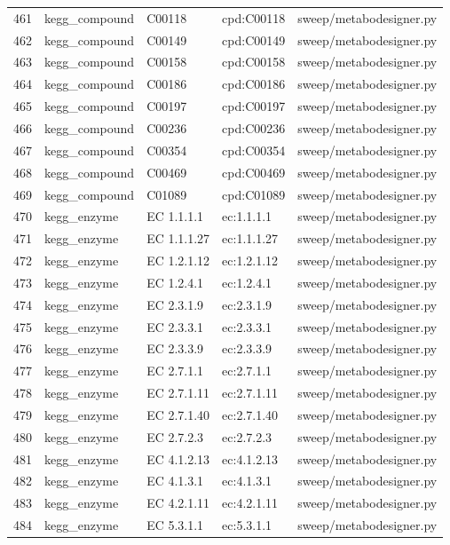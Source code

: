 {\begin{longtable}{rllp{3.2cm}p{4.2cm}}
461 & kegg\_compound & C00118 & cpd:C00118 & sweep/metabodesigner.py\\
462 & kegg\_compound & C00149 & cpd:C00149 & sweep/metabodesigner.py\\
463 & kegg\_compound & C00158 & cpd:C00158 & sweep/metabodesigner.py\\
464 & kegg\_compound & C00186 & cpd:C00186 & sweep/metabodesigner.py\\
465 & kegg\_compound & C00197 & cpd:C00197 & sweep/metabodesigner.py\\
466 & kegg\_compound & C00236 & cpd:C00236 & sweep/metabodesigner.py\\
467 & kegg\_compound & C00354 & cpd:C00354 & sweep/metabodesigner.py\\
468 & kegg\_compound & C00469 & cpd:C00469 & sweep/metabodesigner.py\\
469 & kegg\_compound & C01089 & cpd:C01089 & sweep/metabodesigner.py\\
470 & kegg\_enzyme & EC 1.1.1.1 & ec:1.1.1.1 & sweep/metabodesigner.py\\
471 & kegg\_enzyme & EC 1.1.1.27 & ec:1.1.1.27 & sweep/metabodesigner.py\\
472 & kegg\_enzyme & EC 1.2.1.12 & ec:1.2.1.12 & sweep/metabodesigner.py\\
473 & kegg\_enzyme & EC 1.2.4.1 & ec:1.2.4.1 & sweep/metabodesigner.py\\
474 & kegg\_enzyme & EC 2.3.1.9 & ec:2.3.1.9 & sweep/metabodesigner.py\\
475 & kegg\_enzyme & EC 2.3.3.1 & ec:2.3.3.1 & sweep/metabodesigner.py\\
476 & kegg\_enzyme & EC 2.3.3.9 & ec:2.3.3.9 & sweep/metabodesigner.py\\
477 & kegg\_enzyme & EC 2.7.1.1 & ec:2.7.1.1 & sweep/metabodesigner.py\\
478 & kegg\_enzyme & EC 2.7.1.11 & ec:2.7.1.11 & sweep/metabodesigner.py\\
479 & kegg\_enzyme & EC 2.7.1.40 & ec:2.7.1.40 & sweep/metabodesigner.py\\
480 & kegg\_enzyme & EC 2.7.2.3 & ec:2.7.2.3 & sweep/metabodesigner.py\\
481 & kegg\_enzyme & EC 4.1.2.13 & ec:4.1.2.13 & sweep/metabodesigner.py\\
482 & kegg\_enzyme & EC 4.1.3.1 & ec:4.1.3.1 & sweep/metabodesigner.py\\
483 & kegg\_enzyme & EC 4.2.1.11 & ec:4.2.1.11 & sweep/metabodesigner.py\\
484 & kegg\_enzyme & EC 5.3.1.1 & ec:5.3.1.1 & sweep/metabodesigner.py\\

\end{longtable}}

